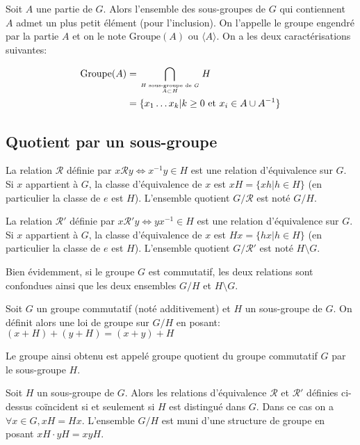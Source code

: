 \begin{prop}
Soit $A$ une partie de $G$. Alors l'ensemble des sous-groupes de $G$ qui contiennent $A$ admet un plus petit élément (pour l'inclusion). On l'appelle le groupe engendré par la partie $A$ et on le note $\text{Groupe}(A)$ ou $\langle A \rangle$. On a les deux caractérisations suivantes:

\begin{align*} 
\text{Groupe}(A) &= \bigcap_{H \text{ sous-groupe de } G \atop A \subset H} H \\
&= \{x_1 \ldots x_k | k \geq 0 \text{ et } x_i \in A \cup A^{-1}\}
\end{align*}
\end{prop}

\subsection{Quotient par un sous-groupe}

\begin{thm}
La relation $\mathcal{R}$ définie par $x \mathcal{R} y \Leftrightarrow x^{-1}y \in H$ est une relation d'équivalence sur $G$. Si $x$ appartient à $G$, la classe d'équivalence de $x$ est $xH = \{xh | h \in H\}$ (en particulier la classe de $e$ est $H$). L'ensemble quotient $G/\mathcal{R}$ est noté $G/H$.
\end{thm}

\begin{thm}
La relation $\mathcal{R}'$ définie par $x \mathcal{R}' y \Leftrightarrow yx^{-1} \in H$ est une relation d'équivalence sur $G$. Si $x$ appartient à $G$, la classe d'équivalence de $x$ est $Hx = \{hx | h \in H\}$ (en particulier la classe de $e$ est $H$). L'ensemble quotient $G/\mathcal{R}'$ est noté $H \setminus G$.
\end{thm}

\begin{rem}
Bien évidemment, si le groupe $G$ est commutatif, les deux relations sont confondues ainsi que les deux ensembles $G/H$ et $H \setminus G$.
\end{rem}

\begin{thm}
Soit $G$ un groupe commutatif (noté additivement) et $H$ un sous-groupe de $G$. On définit alors une loi de groupe sur $G/H$ en posant:
$(x + H) + (y + H) = (x + y) + H$

Le groupe ainsi obtenu est appelé groupe quotient du groupe commutatif $G$ par le sous-groupe $H$.
\end{thm}

\begin{thm}
Soit $H$ un sous-groupe de $G$. Alors les relations d'équivalence $\mathcal{R}$ et $\mathcal{R}'$ définies ci-dessus coïncident si et seulement si $H$ est distingué dans $G$. Dans ce cas on a $\forall x \in G, xH = Hx$. L'ensemble $G/H$ est muni d'une structure de groupe en posant $xH \cdot yH = xyH$.
\end{thm}